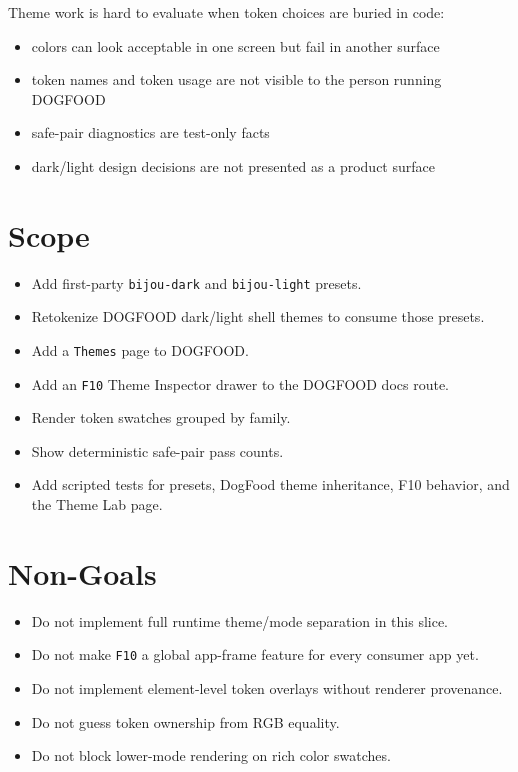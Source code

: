 Theme work is hard to evaluate when token choices are buried in code:

\begin{itemize}
\tightlist
\item
  colors can look acceptable in one screen but fail in another surface
\item
  token names and token usage are not visible to the person running DOGFOOD
\item
  safe-pair diagnostics are test-only facts
\item
  dark/light design decisions are not presented as a product surface
\end{itemize}

\section{Scope}\label{record-179-scope}

\begin{itemize}
\tightlist
\item
  Add first-party \texttt{b\allowbreak{}i\allowbreak{}j\allowbreak{}o\allowbreak{}u\allowbreak{}-\allowbreak{}d\allowbreak{}a\allowbreak{}r\allowbreak{}k} and \texttt{b\allowbreak{}i\allowbreak{}j\allowbreak{}o\allowbreak{}u\allowbreak{}-\allowbreak{}l\allowbreak{}i\allowbreak{}g\allowbreak{}h\allowbreak{}t} presets.
\item
  Retokenize DOGFOOD dark/light shell themes to consume those presets.
\item
  Add a \texttt{T\allowbreak{}h\allowbreak{}e\allowbreak{}m\allowbreak{}e\allowbreak{}s} page to DOGFOOD.
\item
  Add an \texttt{F\allowbreak{}1\allowbreak{}0} Theme Inspector drawer to the DOGFOOD docs route.
\item
  Render token swatches grouped by family.
\item
  Show deterministic safe-pair pass counts.
\item
  Add scripted tests for presets, DogFood theme inheritance, F10 behavior, and the Theme Lab page.
\end{itemize}

\section{Non-Goals}\label{record-179-non-goals}

\begin{itemize}
\tightlist
\item
  Do not implement full runtime theme/mode separation in this slice.
\item
  Do not make \texttt{F\allowbreak{}1\allowbreak{}0} a global app-frame feature for every consumer app yet.
\item
  Do not implement element-level token overlays without renderer provenance.
\item
  Do not guess token ownership from RGB equality.
\item
  Do not block lower-mode rendering on rich color swatches.
\end{itemize}

